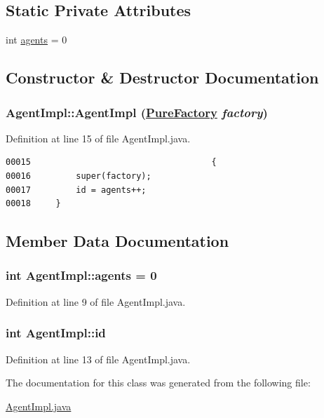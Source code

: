 \subsection*{Static Private Attributes}
\begin{CompactItemize}
\item 
int \hyperlink{classAgentImpl_r0}{agents} = 0
\end{CompactItemize}


\subsection{Constructor \& Destructor Documentation}
\hypertarget{classAgentImpl_c0}{
\subsubsection[AgentImpl]{\setlength{\rightskip}{0pt plus 5cm}Agent\-Impl::Agent\-Impl (\hyperlink{classPureFactory}{Pure\-Factory} {\em factory})}}
\label{classAgentImpl_c0}




Definition at line 15 of file Agent\-Impl.java.\footnotesize\begin{verbatim}00015                                    {
00016         super(factory);
00017         id = agents++;
00018     }
\end{verbatim}\normalsize 


\subsection{Member Data Documentation}
\hypertarget{classAgentImpl_r0}{
\subsubsection[agents]{\setlength{\rightskip}{0pt plus 5cm}int Agent\-Impl::agents = 0}}
\label{classAgentImpl_r0}




Definition at line 9 of file Agent\-Impl.java.\hypertarget{classAgentImpl_o0}{
\subsubsection[id]{\setlength{\rightskip}{0pt plus 5cm}int Agent\-Impl::id}}
\label{classAgentImpl_o0}




Definition at line 13 of file Agent\-Impl.java.

The documentation for this class was generated from the following file:\begin{CompactItemize}
\item 
\hyperlink{AgentImpl_8java-source}{Agent\-Impl.java}\end{CompactItemize}
